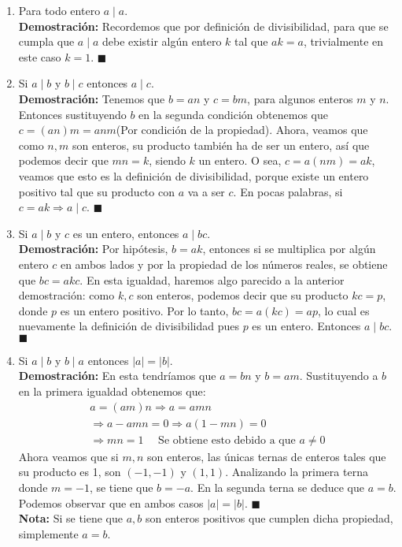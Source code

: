 \documentclass[letterpaper, 13pt]{article}
\begin{document}
 \begin{enumerate}
	\item Para todo entero $a \mid a$. \\
	\textbf{Demostración:} Recordemos que por definición de divisibilidad, para que se cumpla que $a \mid a$ debe existir algún entero $k$ tal que $ak=a$, trivialmente en este caso $k=1$. $\blacksquare$ \\
	\item Si $a\mid b$ y $b \mid c$ entonces $a \mid c$.
	\\
	\textbf{Demostración:} Tenemos que $b=an$ y $c=bm$, para algunos enteros $m$ y $n$. Entonces sustituyendo $b$ en la segunda condición obtenemos que $c=(an)m=anm$(Por condición de la propiedad). Ahora, veamos que como $n,m$ son enteros, su producto también ha de ser un entero, así que podemos decir que $mn=k$, siendo $k$ un entero. O sea, $c=a(nm)=ak$, veamos que esto es la definición de divisibilidad, porque existe un entero positivo tal que su producto con $a$ va a ser $c$. En pocas palabras, si $c=ak \Longrightarrow a\mid c$. $\blacksquare$ \\
	\item Si $a \mid b$ y $c$ es un entero, entonces $a \mid bc$.
	\\
	\textbf{Demostración:} Por hipótesis, $b=ak$, entonces si se multiplica por algún entero $c$ en ambos lados y por la propiedad de los números reales, se obtiene que $bc=akc$. En esta igualdad, haremos algo parecido a la anterior demostración: como $k,c$ son enteros, podemos decir que su producto $kc=p$, donde $p$ es un entero positivo. Por lo tanto, $bc=a(kc)=ap$, lo cual es nuevamente la definición de divisibilidad pues $p$ es un entero. Entonces $a \mid bc$. $\blacksquare$\newpage
	\item Si $a \mid b$ y $b \mid a$ entonces $\lvert a \rvert = \lvert b \rvert $.
	\\
	\textbf{Demostración:} En esta tendríamos que $a=bn$ y $b=am$. Sustituyendo a $b$ en la primera igualdad obtenemos que: \begin{gather*}
		a=(am)n \Rightarrow a=amn \\
		\Rightarrow a-amn=0 \Rightarrow a(1-mn)=0 \\
		\Rightarrow mn=1 \quad \text{ Se obtiene esto debido a que $a \neq 0$}
	\end{gather*}
	Ahora veamos que si $m,n$ son enteros, las únicas ternas de enteros tales que su producto es 1, son $(-1,-1)$ y $(1,1)$. Analizando la primera terna donde $m=-1$, se tiene que $b=-a$. En la segunda terna se deduce que $a=b$. Podemos observar que en ambos casos $\lvert a \rvert = \lvert b \rvert $. $\blacksquare$\\ \textbf{Nota:} Si se tiene que $a,b$ son enteros positivos que cumplen dicha propiedad, simplemente $a=b$.

\end{enumerate}
\end{document}
